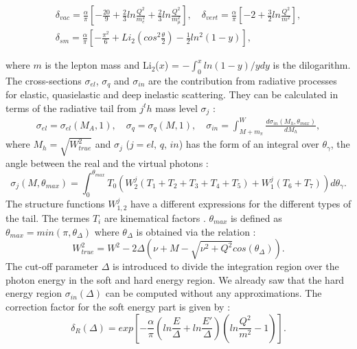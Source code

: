 \begin{equation}
  \begin{split}
    \delta_{vac} = \frac{\alpha}{\pi}\left[-\frac{20}{9}+\frac{2}{3}ln \frac{Q^2}{m_e^2}+\frac{2}{3}ln \frac{Q^2}{m^2_{\mu}}\right], \quad
    \delta_{vert} = \frac{\alpha}{\pi}\left[-2+\frac{3}{2}ln \frac{Q^2}{m^2}\right], \\
    \delta_{sm} = \frac{\alpha}{\pi}\left[-\frac{\pi^2}{6}+Li_2\left(cos^2 \frac{\theta}{2}\right)- \frac{1}{2}ln^2(1-y)\right],
  \end{split}
\end{equation}

where $m$ is the lepton mass and Li$_2$($x$) = $-\int_0^x ln(1-y)/y dy$ is the dilogarithm. The cross-sections $\sigma_{el}$, $\sigma_q$ and $\sigma_{in}$ are the contribution from radiative processes for elastic, quasielastic and deep inelastic scattering. They can be calculated in terms of the radiative tail from $j^th$ mass level $\sigma_j$ :
%
\begin{equation}
  \begin{split}
    \sigma_{el} = \sigma_{el}(M_A,1), \quad
    \sigma_{q} = \sigma_{q}(M,1), \quad
    \sigma_{in} = \int_{M+m_{\pi}}^W \frac{d\sigma_{in}(M_h,\theta_{max})}{dM_h},
  \end{split}
\end{equation}
%
where $M_h=\sqrt{W^2_{true}}$ and $\sigma_j$ ($j=el,\,q,\,in$) has the form of an integral over $\theta_{\gamma}$, the angle between the real and the virtual photons :
%
\begin{equation}
  \sigma_j(M,\theta_{max}) = \int_0^{\theta_{max}} T_0(W^j_2(T_1+T_2+T_3+T_4+T_5)+W^j_1(T_6+T_7))d\theta_{\gamma}.
\end{equation}
%
The structure functions $W^j_{1,2}$ have a different expressions for the different types of the tail. The termes $T_i$ are kinematical factors \cite{MoTsai}. $\theta_{max}$ is defined as $\theta_{max} = min(\pi,\theta_{\Delta})$ where $\theta_{\Delta}$ is obtained via the relation :
%
\begin{equation}
  W^2_{true} = W^2 - 2\Delta(\nu+M-\sqrt{\nu^2+Q^2}cos(\theta_{\Delta})).
\end{equation}
%
The cut-off parameter $\Delta$ is introduced to divide the integration region over the photon energy in the soft and hard energy region. We already saw that the hard energy region $\sigma_{in}(\Delta)$ can be computed without any approximations. The correction factor for the soft energy part is given by :
%
\begin{equation}
  \delta_R(\Delta) = exp \left[-\frac{\alpha}{\pi}\left(ln \frac{E}{\Delta}+ln \frac{E'}{\Delta}\right)\left(ln \frac{Q^2}{m^2}-1\right)\right].
\end{equation}
